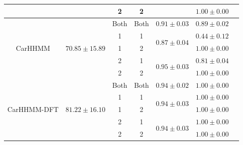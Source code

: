 \documentclass[12pt]{TD-CJS}
\begin{document}
\begin{table}
{\begin{tabular}{ccccccc}
                           &                                    & 2                             & 2                                &                                   & $1.00 \pm 0.00$                       \\ \hline
\multirow{5}{*}{CarHHMM}   & \multirow{5}{*}{$70.85 \pm 15.89$}   & Both                          & Both                             & $0.91 \pm 0.03$                   & $0.89 \pm 0.02$                       \\
                           &                                    & 1                             & 1                                & \multirow{2}{*}{$0.87\pm0.04$}    & $0.44 \pm 0.12$                       \\ 
                           &                                    & 1                             & 2                                &                                   & $1.00 \pm 0.00$                       \\ 
                           &                                    & 2                             & 1                                & \multirow{2}{*}{$0.95\pm0.03$}    & $0.81 \pm 0.04$                       \\ 
                           &                                    & 2                             & 2                                &                                   & $1.00 \pm 0.00$                       \\ \hline
\multirow{5}{*}{CarHHMM-DFT}& \multirow{5}{*}{$81.22 \pm 16.10$}   & Both                          & Both                             & $0.94 \pm 0.02$                   & $1.00 \pm 0.00$                       \\
                           &                                    & 1                             & 1                                & \multirow{2}{*}{$0.94\pm0.03$}    & $1.00 \pm 0.00$                       \\ 
                           &                                    & 1                             & 2                                &                                   & $1.00 \pm 0.00$                       \\ 
                           &                                    & 2                             & 1                                & \multirow{2}{*}{$0.94\pm0.03$}    & $1.00 \pm 0.00$                       \\ 
                           &                                    & 2                             & 2                                &                                   & $1.00 \pm 0.00$                       \\ \hline
\end{tabular}
}
\label{table:accuracy}
\end{table}
\end{document}
